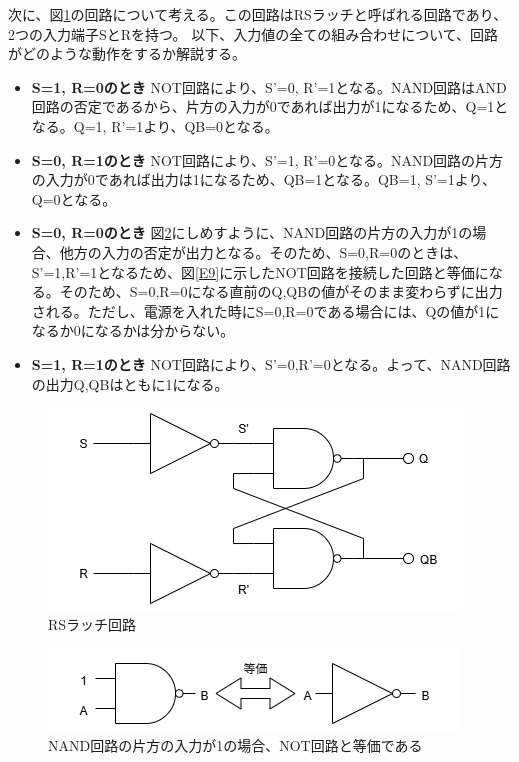 \documentclass[uplatex, a4j, dvipdfmx]{jsarticle}
\begin{document}
次に、図\ref{E10}の回路について考える。この回路はRSラッチと呼ばれる回路であり、2つの入力端子SとRを持つ。
以下、入力値の全ての組み合わせについて、回路がどのような動作をするか解説する。
\begin{itemize}
    \item \textbf{S=1, R=0のとき}
    NOT回路により、S'=0, R'=1となる。NAND回路はAND回路の否定であるから、片方の入力が0であれば出力が1になるため、Q=1となる。Q=1, R'=1より、QB=0となる。

    \item \textbf{S=0, R=1のとき}
    NOT回路により、S'=1, R'=0となる。NAND回路の片方の入力が0であれば出力は1になるため、QB=1となる。QB=1, S'=1より、Q=0となる。

    \item \textbf{S=0, R=0のとき}
    図\ref{E11}にしめすように、NAND回路の片方の入力が1の場合、他方の入力の否定が出力となる。そのため、S=0,R=0のときは、S'=1,R'=1となるため、図\ref{E9}に示したNOT回路を接続した回路と等価になる。そのため、S=0,R=0になる直前のQ,QBの値がそのまま変わらずに出力される。ただし、電源を入れた時にS=0,R=0である場合には、Qの値が1になるか0になるかは分からない。

    \item \textbf{S=1, R=1のとき}
    NOT回路により、S'=0,R'=0となる。よって、NAND回路の出力Q,QBはともに1になる。
\end{itemize}
\begin{figure}[htbp]
    \centering
    \includegraphics[width=0.7\linewidth]{picture/E10.png}
    \caption{RSラッチ回路}
    \label{E10}
\end{figure}
\begin{figure}[htbp]
    \centering
    \includegraphics[width=0.7\linewidth]{picture/E11.png}
    \caption{NAND回路の片方の入力が1の場合、NOT回路と等価である}
    \label{E11}
\end{figure}
\end{document}
